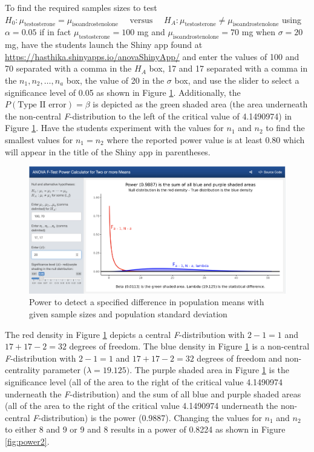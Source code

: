 \documentclass[
]{article}
\begin{document}
To find the required samples sizes to test \(H_0: \mu_\text{testosterone} = \mu_\text{isoandrostenolone}\quad\text{ versus }\quad H_A: \mu_\text{testosterone} \neq \mu_\text{isoandrostenolone}\) using \(\alpha = 0.05\) if in fact \(\mu_\text{testosterone} = 100\) mg and \(\mu_\text{isoandrostenolone} = 70\) mg when \(\sigma = 20\) mg, have the students launch the Shiny app found at \url{https://hasthika.shinyapps.io/anovaShinyApp/} and enter the values of 100 and 70 separated with a comma in the \(H_A\) box, 17 and 17 separated with a comma in the \(n_1, n_2,\ldots, n_a\) box, the value of 20 in the \(\sigma\) box, and use the slider to select a significance level of 0.05 as shown in Figure \ref{fig:power1}. Additionally, the \(P(\text{Type II error}) = \beta\) is depicted as the green shaded area (the area underneath the non-central \emph{F}-distribution to the left of the critical value of 4.1490974) in Figure \ref{fig:power1}. Have the students experiment with the values for \(n_1\) and \(n_2\) to find the smallest values for \(n_1 = n_2\) where the reported power value is at least 0.80 which will appear in the title of the Shiny app in parentheses.

\begin{figure}

{\centering \includegraphics[width=7.36in]{./pics/fig-power1b} 

}

\caption{Power to detect a specified difference in population means with given sample sizes and population standard deviation}\label{fig:power1}
\end{figure}

The red density in Figure \ref{fig:power1} depicts a central \emph{F}-distribution with \(2 - 1 = 1\) and \(17 + 17 - 2 = 32\) degrees of freedom. The blue density in Figure \ref{fig:power1} is a non-central \emph{F}-distribution with \(2-1 = 1\) and \(17 + 17 - 2 = 32\) degrees of freedom and non-centrality parameter (\(\lambda = 19.125)\). The purple shaded area in Figure \ref{fig:power1} is the significance level (all of the area to the right of the critical value 4.1490974 underneath the \emph{F}-distribution) and the sum of all blue and purple shaded areas (all of the area to the right of the critical value 4.1490974 underneath the non-central \emph{F}-distribution) is the power (0.9887). Changing the values for \(n_1\) and \(n_2\) to either 8 and 9 or 9 and 8 results in a power of 0.8224 as shown in Figure \ref{fig:power2}.
\end{document}
